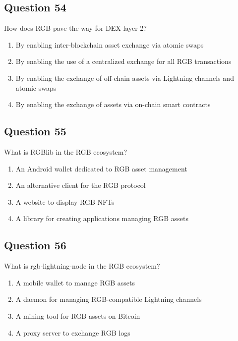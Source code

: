 \documentclass[12pt,a4paper]{article}
\begin{document}
\bigskip


\subsection*{Question 54}
How does RGB pave the way for DEX layer-2?

\begin{enumerate}[label=\Alph*., leftmargin=*]
\item By enabling inter-blockchain asset exchange via atomic swaps
\item By enabling the use of a centralized exchange for all RGB transactions
\item By enabling the exchange of off-chain assets via Lightning channels and atomic swaps
\item By enabling the exchange of assets via on-chain smart contracts
\end{enumerate}

\bigskip


\subsection*{Question 55}
What is RGBlib in the RGB ecosystem?

\begin{enumerate}[label=\Alph*., leftmargin=*]
\item An Android wallet dedicated to RGB asset management
\item An alternative client for the RGB protocol
\item A website to display RGB NFTs
\item A library for creating applications managing RGB assets
\end{enumerate}

\bigskip


\subsection*{Question 56}
What is rgb-lightning-node in the RGB ecosystem?

\begin{enumerate}[label=\Alph*., leftmargin=*]
\item A mobile wallet to manage RGB assets
\item A daemon for managing RGB-compatible Lightning channels
\item A mining tool for RGB assets on Bitcoin
\item A proxy server to exchange RGB logs
\end{enumerate}
\end{document}
